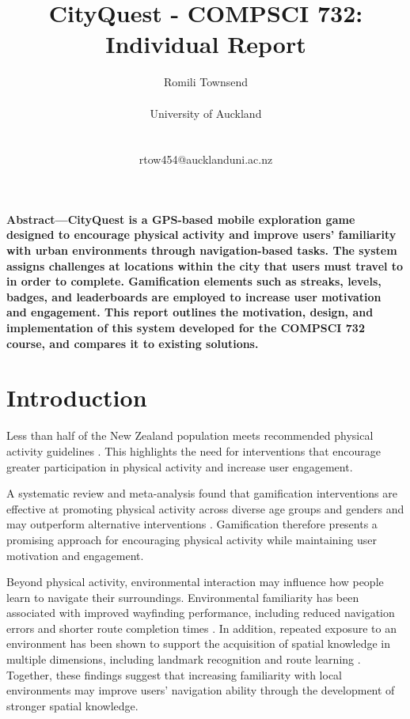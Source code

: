\documentclass{vgtc}                          %
\title{CityQuest - COMPSCI 732: Individual Report}
\author{Romili Townsend \\ 
    \parbox{1.4in}{\scriptsize \centering University of Auckland}\\
    \parbox{1.4in}{\scriptsize \centering rtow454@aucklanduni.ac.nz}
}
\begin{document}
\maketitle

\firstsection{}
\textbf{Abstract---CityQuest is a GPS-based mobile exploration game designed to encourage physical activity and improve users' familiarity with urban environments through navigation-based tasks.
The system assigns challenges at locations within the city that users must travel to in order to complete. Gamification elements such as streaks, levels, badges, and leaderboards are employed to increase user motivation and engagement.
This report outlines the motivation, design, and implementation of this system developed for the COMPSCI 732 course, and compares it to existing solutions.}


\section{Introduction} 

Less than half of the New Zealand population meets recommended physical activity guidelines \cite{PhysicalActivityProfilesandPerceivedEnvironmentalDeterminantsinNewZealandANationalCrossSectionalStudy}. This highlights the need for interventions that encourage greater participation in physical activity and increase user engagement.

A systematic review and meta-analysis found that gamification interventions are effective at promoting physical activity across diverse age groups and genders and may outperform alternative interventions \cite{mazeas2022gamification}. Gamification therefore presents a promising approach for encouraging physical activity while maintaining user motivation and engagement.

Beyond physical activity, environmental interaction may influence how people learn to navigate their surroundings. Environmental familiarity has been associated with improved wayfinding performance, including reduced navigation errors and shorter route completion times \cite{ONEILL1992319}. In addition, repeated exposure to an environment has been shown to support the acquisition of spatial knowledge in multiple dimensions, including landmark recognition and route learning \cite{YING2026103031}. Together, these findings suggest that increasing familiarity with local environments may improve users' navigation ability through the development of stronger spatial knowledge.
\end{document}

